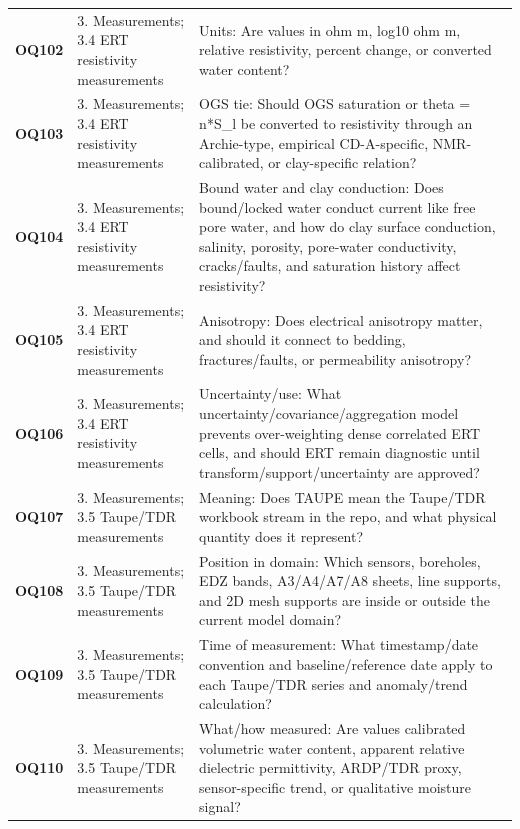 \begin{longtable}{@{}L{0.10\textwidth} L{0.23\textwidth} L{0.59\textwidth}@{}}
\addlinespace[0.16em]
\textbf{OQ102} & 3. Measurements; 3.4 ERT resistivity measurements & Units: Are values in ohm m, log10 ohm m, relative resistivity, percent change, or converted water content?\\
\addlinespace[0.16em]
\textbf{OQ103} & 3. Measurements; 3.4 ERT resistivity measurements & OGS tie: Should OGS saturation or theta = n*S\_l be converted to resistivity through an Archie-type, empirical CD-A-specific, NMR-calibrated, or clay-specific relation?\\
\addlinespace[0.16em]
\textbf{OQ104} & 3. Measurements; 3.4 ERT resistivity measurements & Bound water and clay conduction: Does bound/locked water conduct current like free pore water, and how do clay surface conduction, salinity, porosity, pore-water conductivity, cracks/faults, and saturation history affect resistivity?\\
\addlinespace[0.16em]
\textbf{OQ105} & 3. Measurements; 3.4 ERT resistivity measurements & Anisotropy: Does electrical anisotropy matter, and should it connect to bedding, fractures/faults, or permeability anisotropy?\\
\addlinespace[0.16em]
\textbf{OQ106} & 3. Measurements; 3.4 ERT resistivity measurements & Uncertainty/use: What uncertainty/covariance/aggregation model prevents over-weighting dense correlated ERT cells, and should ERT remain diagnostic until transform/support/uncertainty are approved?\\
\addlinespace[0.16em]
\textbf{OQ107} & 3. Measurements; 3.5 Taupe/TDR measurements & Meaning: Does TAUPE mean the Taupe/TDR workbook stream in the repo, and what physical quantity does it represent?\\
\addlinespace[0.16em]
\textbf{OQ108} & 3. Measurements; 3.5 Taupe/TDR measurements & Position in domain: Which sensors, boreholes, EDZ bands, A3/A4/A7/A8 sheets, line supports, and 2D mesh supports are inside or outside the current model domain?\\
\addlinespace[0.16em]
\textbf{OQ109} & 3. Measurements; 3.5 Taupe/TDR measurements & Time of measurement: What timestamp/date convention and baseline/reference date apply to each Taupe/TDR series and anomaly/trend calculation?\\
\addlinespace[0.16em]
\textbf{OQ110} & 3. Measurements; 3.5 Taupe/TDR measurements & What/how measured: Are values calibrated volumetric water content, apparent relative dielectric permittivity, ARDP/TDR proxy, sensor-specific trend, or qualitative moisture signal?\\

\end{longtable}

